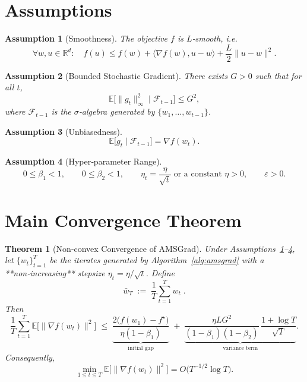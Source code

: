 \documentclass{article}
\newtheorem{theorem}{Theorem}
\newtheorem{assumption}{Assumption}
\newcommand{\EE}{\mathbb{E}}
\newcommand{\RR}{\mathbb{R}}
\begin{document}
\section*{Assumptions}
\label{sec:assumptions}
\begin{assumption}[Smoothness]\label{asm:smooth}
The objective $f$ is $L$‑smooth, i.e.
\[
\forall w,u\in\RR^{d}:\quad
f(u)\le f(w)+\langle\nabla f(w),u-w\rangle+\frac{L}{2}\|u-w\|^{2}.
\]
\end{assumption}
\begin{assumption}[Bounded Stochastic Gradient]\label{asm:bounded}
There exists $G>0$ such that for all $t$,
\[
\EE\!\bigl[\|g_{t}\|_{\infty}^{2}\mid\mathcal{F}_{t-1}\bigr]\le G^{2},
\]
where $\mathcal{F}_{t-1}$ is the $\sigma$‑algebra generated by $\{w_{1},\dots,w_{t-1}\}$.
\end{assumption}
\begin{assumption}[Unbiasedness]\label{asm:unbiased}
\[
\EE\!\bigl[g_{t}\mid\mathcal{F}_{t-1}\bigr]=\nabla f(w_{t}) .
\]
\end{assumption}
\begin{assumption}[Hyper‑parameter Range]\label{asm:hyper}
\[
0\le\beta_{1}<1,\qquad 0\le\beta_{2}<1,\qquad 
\eta_{t}=\frac{\eta}{\sqrt{t}}\;\text{or a constant }\eta>0,\qquad 
\varepsilon>0.
\]
\end{assumption}

\section*{Main Convergence Theorem}
\begin{theorem}[Non‑convex Convergence of AMSGrad]\label{thm:main}
Under Assumptions~\ref{asm:smooth}–\ref{asm:hyper}, let $\{w_{t}\}_{t=1}^{T}$ be the iterates generated by Algorithm~\ref{alg:amsgrad} with a **non‑increasing** stepsize $\eta_{t}=\eta/\sqrt{t}$. Define
\[
\bar w_{T}\;:=\;\frac{1}{T}\sum_{t=1}^{T} w_{t}\; .
\]
Then
\[
\frac{1}{T}\sum_{t=1}^{T}\EE\!\bigl[\|\nabla f(w_{t})\|^{2}\bigr]
\;\le\;
\underbrace{\frac{2\bigl(f(w_{1})-f^{\star}\bigr)}{\eta(1-\beta_{1})}
}_{\displaystyle\text{initial gap}}
\;+\;
\underbrace{\frac{\eta L G^{2}}{(1-\beta_{1})(1-\beta_{2})}\,
\frac{1+\log T}{\sqrt{T}}}_{\displaystyle\text{variance term}} .
\]
Consequently,
\[
\min_{1\le t\le T}\EE\!\bigl[\|\nabla f(w_{t})\|^{2}\bigr]
= O\!\bigl(T^{-1/2}\log T\bigr).
\]
\end{theorem}
\end{document}
